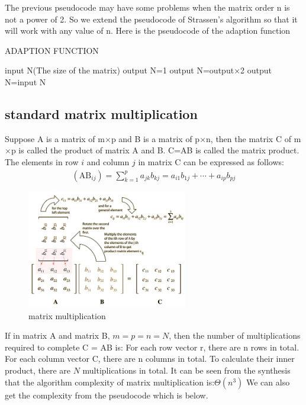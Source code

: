 \documentclass[journal]{IEEEtran}
\begin{document}
The previous pseudocode may have some problems when the matrix order n is not a power of 2.
So we extend the pseudocode of Strassen’s algorithm so that it will work with any value of n.
Here is the pseudocode of the adaption function
\begin{algorithm}[htb]  
  \caption{ADAPTION FUNCTION}  
   
  \begin{algorithmic}  
    \Require  
    input N(The size of the matrix)
    \State output N=1
    \State output N=output$\times$2 
    \EndWhile
    \Else 
    \State output N=input N
    \EndIf
  \end{algorithmic}  
\end{algorithm}



\subsection{standard matrix multiplication}


Suppose A is a matrix of m$\times$p and B is a matrix of p$\times$n, then the matrix C of m$\times$p is called the product of matrix A and B.
C=AB is called the matrix product.
The elements in row $i$ and column $j$ in matrix C can be expressed as follows:
\begin{align}
  (\mathrm{AB}_{ij})=\sum_{k=1}^{p}a_{jk}b_{kj}=a_{i1}b_{1j}+\cdots+a_{ip}b_{pj}
\end{align}

\begin{figure}[h]
	\centering
	\includegraphics[width=70mm]{./img/Fig1.jpg}
	\caption{matrix multiplication}
	\label{fig_sim}
\end{figure}


If in matrix A and matrix B, $m=p=n=N$, then the number of multiplications required to complete C = AB is:
For each row vector r, there are n rows in total.
For each column vector C, there are n columns in total.
To calculate their inner product, there are $N$ multiplications in total.
It can be seen from the synthesis that the algorithm complexity of matrix multiplication is:$\Theta(n^3)$
We can also get the complexity from the pseudocode which is below.
\end{document}
